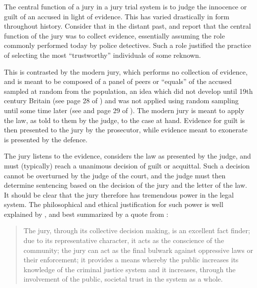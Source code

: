 The central function of a jury in a jury trial system is to judge the innocence or guilt of an accused in light of evidence. This
has varied drastically in form throughout history. Consider that in the distant past, \cite{vonmosch1921} and \cite{hoffman1997}
report that the central function of the jury was to collect evidence, essentially assuming the role commonly performed today by
police detectives. Such a role justified the practice of selecting the most ``trustworthy'' individuals of some reknown.

This is contrasted by the modern jury, which performs no collection of evidence, and is meant to be composed of a panel of peers
or ``equals'' of the accused sampled at random from the population, an idea which did not develop until 19th century Britain (see
page 28 of \cite{hansvidjudging}) and was not applied using random sampling until some time later (see \cite{hoffman1997} and page
29 of \cite{hansvidjudging}). The modern jury is meant to apply the law, as told to them by the judge\footnotemark, to the case at
hand. Evidence for guilt is then presented to the jury by the prosecutor, while evidence meant to exonerate is presented by the
defence.

The jury listens to the evidence, considers the law as presented by the judge, and must (typically) reach a unanimous
decision of guilt or acquittal. Such a decision cannot be overturned by the judge of the court, and the judge must then determine
sentencing based on the decision of the jury and the letter of the law\footnotemark[\value{footnote}]. It should be clear that the
jury therefore has tremendous power in the legal system. The philosophical and ethical justification for such power is well
explained by \cite{woolley2018}, and best summarized by a quote from \cite{rvsherratt}:


\begin{quote}
  \centering
  The jury, through its collective decision making, is an excellent fact finder; due to its representative character, it acts as
  the conscience of the community; the jury can act as the final bulwark against oppressive laws or their enforcement; it provides
  a means whereby the public increases its knowledge of the criminal justice system and it increases, through the involvement of
  the public, societal trust in the system as a whole.
\end{quote}

